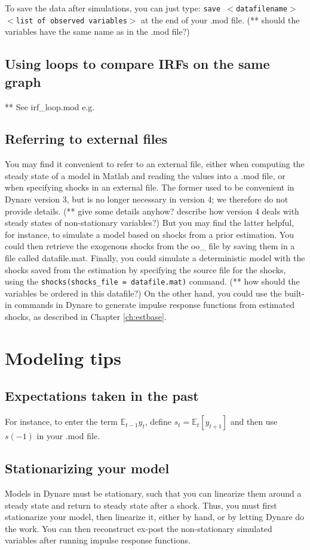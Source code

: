 To save the data after simulations, you can just type: \texttt{save $<$datafilename$>$ $<$list of observed variables$>$} at the end of your .mod file. (** should the variables have the same name as in the .mod file?)

\subsection{Using loops to compare IRFs on the same graph}
** See irf\_loop.mod e.g.

\subsection{Referring to external files}
You may find it convenient to refer to an external file, either when computing the steady state of a model in Matlab and reading the values into a .mod file, or when specifying shocks in an external file. The former used to be convenient in Dynare version 3, but is no longer necessary in version 4; we therefore do not provide details. (** give some details anyhow? describe how version 4 deals with steady states of non-stationary variables?) But you may find the latter helpful, for instance, to simulate a model based on shocks from a prior estimation. You could then retrieve the exogenous shocks from the oo\_ file by saving them in a file called datafile.mat. Finally, you could simulate a deterministic model with the shocks saved from the estimation by specifying the source file for the shocks, using the \texttt{shocks(shocks\_file = datafile.mat)} command. (** how should the variables be ordered in this datafile?)
On the other hand, you could use the built-in commands in Dynare to generate impulse response functions from estimated shocks, as described in Chapter \ref{ch:estbase}. \\

\section{Modeling tips}

\subsection{Expectations taken in the past}
For instance, to enter the term $\mathbb{E}_{t-1}y_t$, define $s_t=\mathbb{E}_t[y_{t+1}]$ and then use $s(-1)$ in your .mod file.

\subsection{Stationarizing your model}
Models in Dynare must be stationary, such that you can linearize them around a steady state and return to steady state after a shock. Thus, you must first stationarize your model, then linearize it, either by hand, or by letting Dynare do the work.  You can then reconstruct ex-post the non-stationary simulated variables after running impulse response functions.\\

